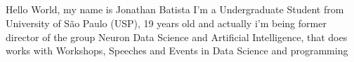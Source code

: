 \documentclass[9pt]{developercv} %
\begin{document}
\begin{minipage}[t]{0.275\textwidth} %
	\vspace{-\baselineskip} %
	
	\\
	\\
	\\	
	\\
\end{minipage}


\vspace{0.5cm}



\begin{minipage}[t]{0.4\textwidth} %
	\vspace{-\baselineskip} %
	
	{ Hello World, my name is Jonathan Batista I'm a Undergraduate Student from University of São Paulo (USP), 19 years old and actually i'm being former director of the group Neuron Data Science and Artificial Intelligence, that does works with Workshops, Speeches and Events in Data Science and programming }\\ %
\end{minipage}
\hfill %
\begin{minipage}[t]{0.5\textwidth} %
	\vspace{-\baselineskip} %
	\begin{barchart}{5.5}
	\end{barchart}
\end{minipage}
\end{document}

